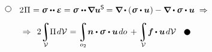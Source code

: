 \vspace{-0.55em}\begin{multline*}
\tikz[baseline=-1ex] \draw [line width=.5pt, color=black, fill=white] (0, 0) circle (.8ex);
\hspace{2.25ex}
2 \hspace{.1ex} \potential \hspace{.1ex} = \linearstress \dotdotp \infinitesimaldeformation =
\linearstress \hspace{.1ex} \dotdotp \hspace{-0.12ex} \boldnabla \bm{u}^{\mathsf{S}} \hspace{-0.12ex} =
\boldnabla \hspace{-0.1ex} \dotp \left( \hspace{.1ex} \linearstress \dotp \bm{u} \hspace{.1ex} \right) -
\tikzmark{beginMinusLoad} \boldnabla \dotp \linearstress \tikzmark{endMinusLoad} \dotp \bm{u} \;\Rightarrow
\\[.5em]
%
\Rightarrow\;\,
\displaystyle 2 \hspace{-0.16em}
\integral\displaylimits_{\mathcal{V}} \hspace{-0.5ex} \potential \hspace{.2ex} d\mathcal{V} \hspace{.12ex} =
\integral\displaylimits_{o_2} \hspace{-0.4ex} \tikzmark{beginSurfaceLoad} \unitnormalvector \dotp \linearstress \tikzmark{endSurfaceLoad} \hspace{.1ex} \dotp \bm{u} \hspace{.25ex} do \hspace{.4ex} +
\integral\displaylimits_{\mathcal{V}} \hspace{-0.4ex} \bm{f} \hspace{-0.1ex} \dotp \bm{u} \hspace{.25ex} d\mathcal{V}
\hspace{2.25ex}
\tikz[baseline=-0.6ex] \draw [color=black, fill=black] (0, 0) circle (.8ex);
\end{multline*}%
%

